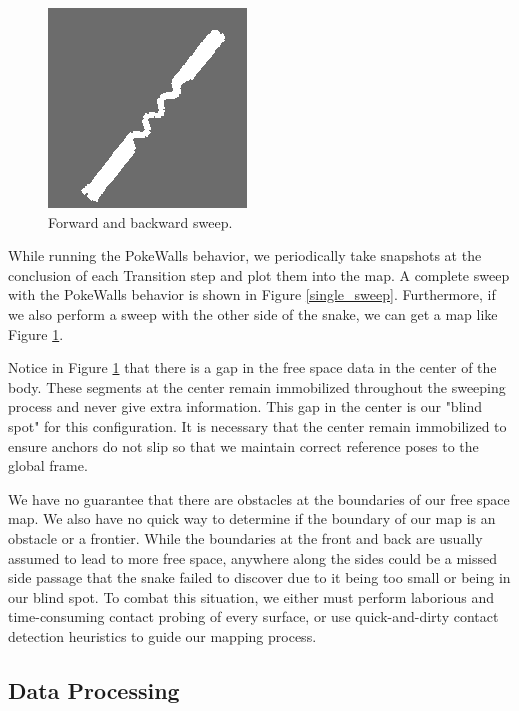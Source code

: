 \begin{figure}
  \begin{center}
    \includegraphics[scale=1.0]{localOccDouble.png}
  \end{center}
  \caption{Forward and backward sweep.}
	\label{double_sweep}
\end{figure}



While running the PokeWalls behavior, we periodically take snapshots at the conclusion of each Transition step and plot them into the map.  A complete sweep with the PokeWalls behavior is shown in Figure \ref{single_sweep}.   Furthermore, if we also perform a sweep with the other side of the snake, we can get a map like Figure \ref{double_sweep}.

Notice in Figure \ref{double_sweep} that there is a gap in the free space data in the center of the body.  These segments at the center remain immobilized throughout the sweeping process and never give extra information.  This gap in the center is our "blind spot" for this configuration.  It is necessary that the center remain immobilized to ensure anchors do not slip so that we maintain correct reference poses to the global frame.

We have no guarantee that there are obstacles at the boundaries of our free space map.  We also have no quick way to determine if the boundary of our map is an obstacle or a frontier.  While the boundaries at the front and back are usually assumed to lead to more free space, anywhere along the sides could be a missed side passage that the snake failed to discover due to it being too small or being in our blind spot.  To combat this situation, we either must perform laborious and time-consuming contact probing of every surface, or use quick-and-dirty contact detection heuristics to guide our mapping process.

\subsection{Data Processing}

